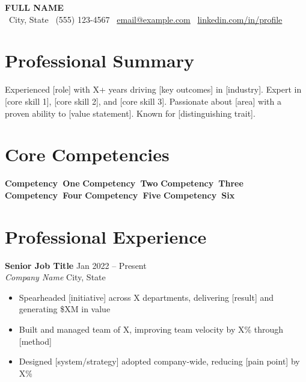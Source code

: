 \documentclass[11pt,a4paper]{article}
\newcommand{\entry}[4]{%
    \noindent\textbf{\color{darktext}#1} \hfill {\small #2} \\
    \textit{#3} \hfill {\small #4}%
}
\newcommand{\skill}[1]{%
    \mbox{\small\textbf{#1}}%
}
\begin{document}
\begin{center}
    {\huge\bfseries\color{accent} FULL NAME} \\[0.4em]
    {\small \faMapMarker*\ City, State \quad\textbar\quad \faPhone*\ (555) 123-4567 \quad\textbar\quad \faEnvelope\ \href{mailto:email@example.com}{email@example.com} \quad\textbar\quad \faLinkedin\ \href{https://linkedin.com/in/profile}{linkedin.com/in/profile}}
\end{center}

\section{Professional Summary}

Experienced [role] with X+ years driving [key outcomes] in [industry]. Expert in [core skill 1], [core skill 2], and [core skill 3]. Passionate about [area] with a proven ability to [value statement]. Known for [distinguishing trait].

\section{Core Competencies}

\skill{Competency One} \enspace\textbar\enspace
\skill{Competency Two} \enspace\textbar\enspace
\skill{Competency Three} \enspace\textbar\enspace
\skill{Competency Four} \enspace\textbar\enspace
\skill{Competency Five} \enspace\textbar\enspace
\skill{Competency Six}

\section{Professional Experience}

\entry{Senior Job Title}{Jan 2022 -- Present}{Company Name}{City, State}
\begin{itemize}[leftmargin=1.5em, itemsep=0.2em, topsep=0.3em]
    \item Spearheaded [initiative] across X departments, delivering [result] and generating \$XM in value
    \item Built and managed team of X, improving team velocity by X\% through [method]
    \item Designed [system/strategy] adopted company-wide, reducing [pain point] by X\%
\end{itemize}

\vspace{0.5em}
\end{document}
